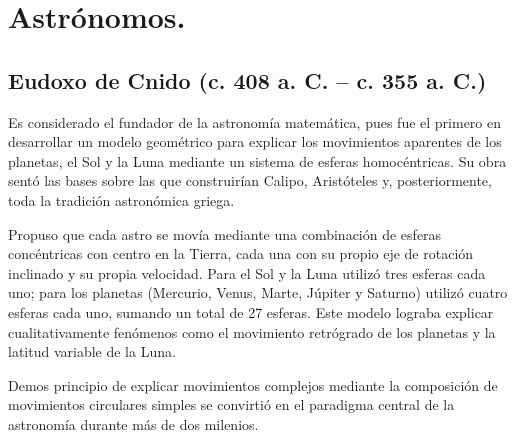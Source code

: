 \documentclass[a4paper,12pt]{article} %
\begin{document}
\vspace{\baselineskip}

\vspace{\baselineskip}

\vspace{\baselineskip}

\vspace{\baselineskip}

\vspace{\baselineskip}

\section{Astrónomos.}
\vspace{\baselineskip}
\vspace{\baselineskip}


\subsection{Eudoxo de Cnido (c. 408 a. C. – c. 355 a. C.) }
\begin{justify}
	Es considerado el fundador de la astronomía matemática, pues fue el primero en desarrollar un modelo geométrico para explicar los
	movimientos aparentes de los planetas, el Sol y la Luna mediante un sistema de esferas homocéntricas. Su obra sentó las bases sobre las que construirían Calipo, Aristóteles y, posteriormente, toda la tradición astronómica griega.
\end{justify}

\begin{justify}
	Propuso que cada astro se movía mediante una combinación de esferas concéntricas con centro en la Tierra, cada una con su propio eje de rotación inclinado y su propia velocidad. Para el Sol y la Luna utilizó tres esferas cada uno; para los planetas 
	(Mercurio, Venus, Marte, Júpiter y Saturno) utilizó cuatro esferas cada uno, sumando un total de 27 esferas. Este modelo lograba explicar cualitativamente fenómenos como el movimiento retrógrado de los planetas y la latitud variable de la Luna.
\end{justify}

\begin{justify}
	Demos
	 principio de explicar movimientos complejos mediante la composición de movimientos circulares simples se convirtió en el paradigma central de la astronomía durante más de dos milenios.
\end{justify}

\newpage
\end{document}

